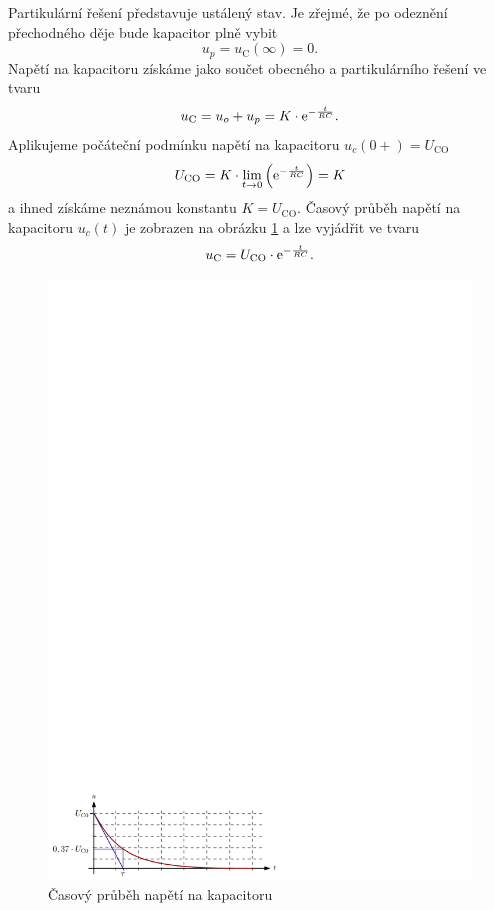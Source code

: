 Partikulární řešení představuje ustálený stav. Je zřejmé, že po odeznění přechodného děje bude kapacitor plně vybit
$$
u_p = u_\mathrm{C}(\infty) = 0.
$$
Napětí na kapacitoru získáme jako součet obecného a partikulárního řešení ve tvaru
$$
u_\mathrm{C} = u_o + u_p = K \cdot \mathrm{e}^{-\frac{t}{RC}}.
$$
Aplikujeme počáteční podmínku napětí na kapacitoru $u_c(0+) = U_\mathrm{CO}$
$$
U_\mathrm{CO} = K \cdot \lim_{t \rightarrow 0} \left( \mathrm{e}^{-\frac{t}{RC}} \right) = K
$$
a ihned získáme neznámou konstantu $K = U_\mathrm{CO}$. Časový průběh napětí na kapacitoru $u_c(t)$ je zobrazen na obrázku \ref{fig:prvni_rad_rc_graf_u} a lze vyjádřit ve tvaru
\begin{equation}
u_\mathrm{C} = U_\mathrm{CO} \cdot \mathrm{e}^{-\frac{t}{RC}}.
\label{eq:prvni_rad_rc_u}
\end{equation}
\begin{figure}[h!]
\centering
\includegraphics[]{prechodne_jevy/prvni_rad/rc_graf_u.pdf}
\caption{Časový průběh napětí na kapacitoru}
\label{fig:prvni_rad_rc_graf_u}
\end{figure}
